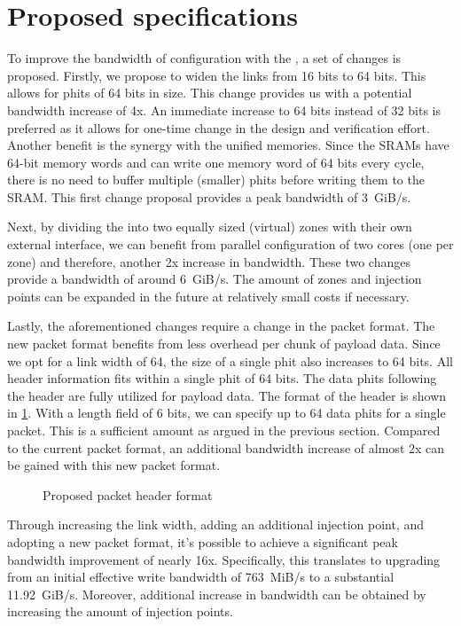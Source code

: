 \section{Proposed specifications}
\label{sec:proposed_noc}
To improve the bandwidth of configuration with the \confignoc{}, a set of changes is proposed. Firstly, we propose to widen the links from 16 bits to 64 bits.
This allows for phits of 64 bits in size.
This change provides us with a potential bandwidth increase of 4x.
An immediate increase to 64 bits instead of 32 bits is preferred as it allows for one-time change in the design and verification effort.
Another benefit is the synergy with the unified memories.
Since the SRAMs have 64-bit memory words and can write one memory word of 64 bits every cycle, there is no need to buffer multiple (smaller) phits before writing them to the SRAM.
This first change proposal provides a peak bandwidth of \SI{3}{GiB/s}.

Next, by dividing the \confignoc{} into two equally sized (virtual) zones with their own external interface, we can benefit from parallel configuration of two cores (one per zone) and therefore, another 2x increase in bandwidth.
These two changes provide a bandwidth of around \SI{6}{GiB/s}. 
The amount of zones and injection points can be expanded in the future at relatively small costs if necessary.

Lastly, the aforementioned changes require a change in the packet format.
The new packet format benefits from less overhead per chunk of payload data.
Since we opt for a link width of 64, the size of a single phit also increases to 64 bits.
All header information fits within a single phit of 64 bits.
The data phits following the header are fully utilized for payload data.
The format of the header is shown in \cref{fig:packet_format_header_new}.
With a length field of 6 bits, we can specify up to 64 data phits for a single packet.
This is a sufficient amount as argued in the previous section. 
Compared to the current packet format, an additional bandwidth increase of almost 2x can be gained with this new packet format.

\begin{figure}[hbtp]
    \centering
    \resizebox{\linewidth}{!}{
        
    }
    \caption{Proposed packet header format}
    \label{fig:packet_format_header_new}
\end{figure}

Through increasing the link width, adding an additional injection point, and adopting a new packet format, it's possible to achieve a significant peak bandwidth improvement of nearly 16x.
Specifically, this translates to upgrading from an initial effective write bandwidth of \SI{763}{MiB/s} to a substantial \SI{11.92}{GiB/s}.
Moreover, additional increase in bandwidth can be obtained by increasing the amount of injection points.
